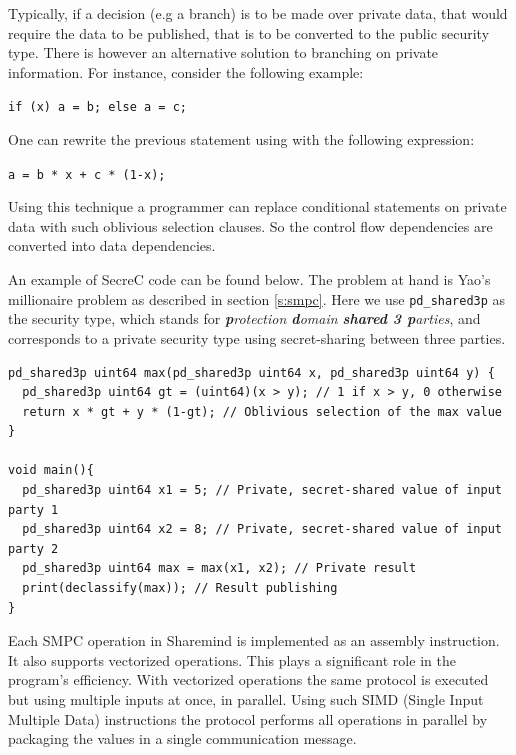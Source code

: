 Typically, if a decision (e.g a branch) is to be made over private data, that would require the data to be published, that is to be converted to the public security type.
There is however an alternative solution to branching on private information.
For instance, consider the following example:

\texttt{if (x) a = b; else a = c; }

One can rewrite the previous statement using with the following expression:

\texttt{a = b * x + c * (1-x); }

Using this technique a programmer can replace conditional statements on private data with such oblivious selection clauses.
So the control flow dependencies are converted into data dependencies.

An example of SecreC code can be found below.
The problem at hand is Yao's millionaire problem \cite{yao1982protocols} as described in section \ref{s:smpc}.
Here we use \texttt{pd\_shared3p} as the security type, which stands for \textit{\textbf{p}rotection \textbf{d}omain \textbf{shared 3 p}arties}, and corresponds to a private security type using secret\hyp sharing between three parties.

{
\begin{verbatim}
pd_shared3p uint64 max(pd_shared3p uint64 x, pd_shared3p uint64 y) {
  pd_shared3p uint64 gt = (uint64)(x > y); // 1 if x > y, 0 otherwise
  return x * gt + y * (1-gt); // Oblivious selection of the max value
}

void main(){
  pd_shared3p uint64 x1 = 5; // Private, secret-shared value of input party 1
  pd_shared3p uint64 x2 = 8; // Private, secret-shared value of input party 2
  pd_shared3p uint64 max = max(x1, x2); // Private result
  print(declassify(max)); // Result publishing
}
\end{verbatim}
\label{l:millionaires}
}

Each SMPC operation in Sharemind is implemented as an assembly instruction. It also supports vectorized operations. This plays a significant role in the program's efficiency.
With vectorized operations the same protocol is executed but using multiple inputs at once, in parallel.
Using such SIMD (Single Input Multiple Data) instructions the protocol performs all operations in parallel by packaging the values in a single communication message.

